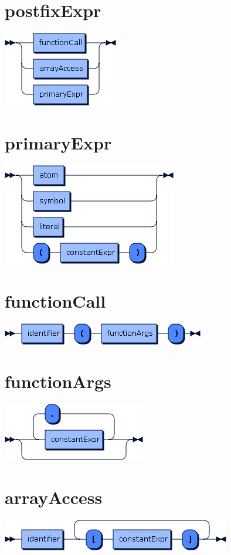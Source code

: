 \begin{appendices}
\section*{postfixExpr}\includegraphics[scale=0.7]{img/ebnf_grammar/postfixExpr}
\section*{primaryExpr}\includegraphics[scale=0.7]{img/ebnf_grammar/primaryExpr}
\section*{functionCall}\includegraphics[scale=0.7]{img/ebnf_grammar/functionCall}
\section*{functionArgs}\includegraphics[scale=0.7]{img/ebnf_grammar/functionArgs}
\section*{arrayAccess}\includegraphics[scale=0.7]{img/ebnf_grammar/arrayAccess}

\end{appendices}
